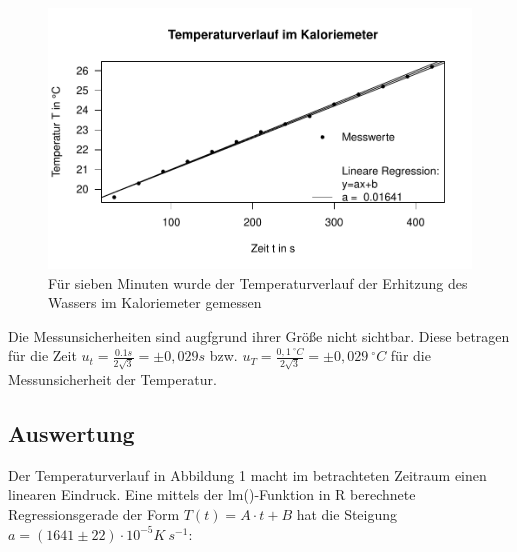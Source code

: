 \documentclass[
  9pt,
]{article}
\newenvironment{Shaded}{\begin{snugshade}}{\end{snugshade}}
\newcommand{\CommentTok}[1]{\textcolor[rgb]{0.56,0.35,0.01}{\textit{#1}}}
\newcommand{\FunctionTok}[1]{\textcolor[rgb]{0.00,0.00,0.00}{#1}}
\newcommand{\NormalTok}[1]{#1}
\newcommand{\OtherTok}[1]{\textcolor[rgb]{0.56,0.35,0.01}{#1}}
\newcommand{\SpecialCharTok}[1]{\textcolor[rgb]{0.00,0.00,0.00}{#1}}
\begin{document}
\begin{figure}

{\centering \includegraphics{Kaloriemeter_files/figure-latex/unnamed-chunk-1-1} 

}

\caption{Für sieben Minuten wurde der Temperaturverlauf der Erhitzung des Wassers im Kaloriemeter gemessen}\label{fig:unnamed-chunk-1}
\end{figure}

Die Messunsicherheiten sind augfgrund ihrer Größe nicht sichtbar. Diese
betragen für die Zeit \(u_t = \frac{0.1s}{2\sqrt{3}}=\pm0,029s\) bzw.
\(u_T = \frac{0,1\ ^{\circ}C}{2\sqrt{3}}=\pm0,029\ ^{\circ}C\) für die
Messunsicherheit der Temperatur.

\hypertarget{auswertung}{%
\subsection{Auswertung}\label{auswertung}}

Der Temperaturverlauf in Abbildung 1 macht im betrachteten Zeitraum
einen linearen Eindruck. Eine mittels der lm()-Funktion in R berechnete
Regressionsgerade der Form \(T(t)=A\cdot t+B\) hat die Steigung
\(a=(1641\pm 22)\cdot 10^{-5}K\ s^{-1}\):

\begin{Shaded}
\end{Shaded}
\end{document}
